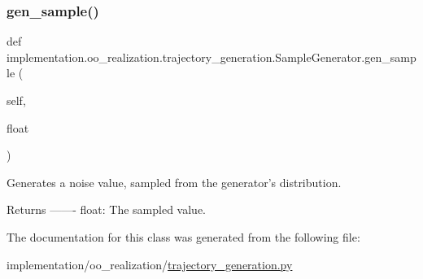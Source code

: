 \subsubsection{\texorpdfstring{gen\+\_\+sample()}{gen\_sample()}}
{\footnotesize\ttfamily def implementation.\+oo\+\_\+realization.\+trajectory\+\_\+generation.\+Sample\+Generator.\+gen\+\_\+sample (\begin{DoxyParamCaption}\item[{}]{self,  }\item[{}]{float }\end{DoxyParamCaption})}

\begin{DoxyVerb}Generates a noise value, sampled from the generator's distribution.

Returns
-------
    float: The sampled value.
\end{DoxyVerb}
 

The documentation for this class was generated from the following file\+:\begin{DoxyCompactItemize}
\item 
implementation/oo\+\_\+realization/\hyperlink{trajectory__generation_8py}{trajectory\+\_\+generation.\+py}\end{DoxyCompactItemize}
